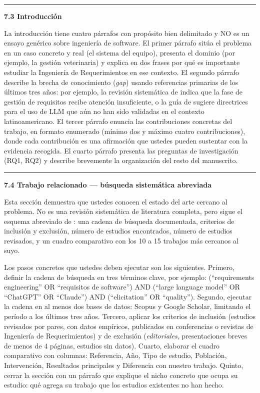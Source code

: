 \documentclass[11pt,a4paper]{article}
\newcounter{secc}
\newcommand{\submark}[1]{\par\vspace{4pt}\noindent
    {\color{uteqgreen}\rule[-1pt]{3.5pt}{12pt}}\hspace{6pt}\textbf{\color{uteqgreen}#1}\par\vspace{2pt}}
\begin{document}
\submark{7.3 Introducción}
La introducción tiene cuatro párrafos con propósito bien delimitado y NO es un ensayo genérico sobre ingeniería de software.
El primer párrafo sitúa el problema en un caso concreto y real (el sistema del equipo), presenta el dominio (por ejemplo, la gestión veterinaria) y explica en dos frases por qué es importante estudiar la Ingeniería de Requerimientos en ese contexto.
El segundo párrafo describe la brecha de conocimiento (\emph{gap}) usando referencias primarias de los últimos tres años: por ejemplo, la revisión sistemática de \cite{cheng2026genai} indica que la fase de gestión de requisitos recibe atención insuficiente, o la guía de \cite{vogelsang2024llm} sugiere directrices para el uso de LLM que aún no han sido validadas en el contexto latinoamericano.
El tercer párrafo enuncia las contribuciones concretas del trabajo, en formato enumerado (mínimo dos y máximo cuatro contribuciones), donde cada contribución es una afirmación que ustedes pueden sustentar con la evidencia recogida.
El cuarto párrafo presenta las preguntas de investigación (RQ1, RQ2) y describe brevemente la organización del resto del manuscrito.

\submark{7.4 Trabajo relacionado --- búsqueda sistemática abreviada}
Esta sección demuestra que ustedes conocen el estado del arte cercano al problema.
No es una revisión sistemática de literatura completa, pero sigue el esquema abreviado de \cite{kitchenham2007guidelines}: una cadena de búsqueda documentada, criterios de inclusión y exclusión, número de estudios encontrados, número de estudios revisados, y un cuadro comparativo con los 10 a 15 trabajos más cercanos al suyo.

Los pasos concretos que ustedes deben ejecutar son los siguientes.
Primero, definir la cadena de búsqueda en tres términos clave, por ejemplo: (``requirements engineering'' OR ``requisitos de software'') AND (``large language model'' OR ``ChatGPT'' OR ``Claude'') AND (``elicitation'' OR ``quality'').
Segundo, ejecutar la cadena en al menos dos bases de datos: Scopus y Google Scholar, limitando el período a los últimos tres años.
Tercero, aplicar los criterios de inclusión (estudios revisados por pares, con datos empíricos, publicados en conferencias o revistas de Ingeniería de Requerimientos) y de exclusión (\emph{editoriales}, presentaciones breves de menos de 4 páginas, estudios sin datos).
Cuarto, elaborar el cuadro comparativo con columnas: Referencia, Año, Tipo de estudio, Población, Intervención, Resultados principales y Diferencia con nuestro trabajo.
Quinto, cerrar la sección con un párrafo que explique el nicho concreto que ocupa su estudio: qué agrega su trabajo que los estudios existentes no han hecho.
\end{document}
